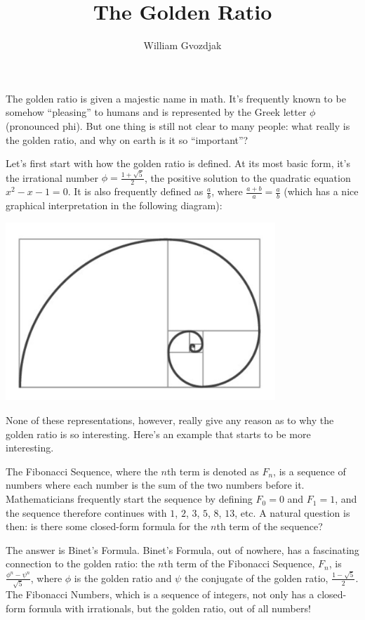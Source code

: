\documentclass{article}
\title{The Golden Ratio}
\author{William Gvozdjak}
\begin{document}
\maketitle

The golden ratio is given a majestic name in math. It’s frequently known to be somehow “pleasing” to humans and is represented by the Greek letter $\phi$ (pronounced phi). But one thing is still not clear to many people: what really is the golden ratio, and why on earth is it so “important”? 

Let’s first start with how the golden ratio is defined. At its most basic form, it’s the irrational number $\phi = \frac{1+\sqrt5}2$, the positive solution to the quadratic equation $x^2-x-1=0$. It is also frequently defined as $\frac ab$, where $\frac{a+b}a = \frac ab$ (which has a nice graphical interpretation in the following diagram):

\begin{center}
    \includegraphics[width=4in]{images/golden-ratio.png}
\end{center}

None of these representations, however, really give any reason as to why the golden ratio is so interesting. Here’s an example that starts to be more interesting.

The Fibonacci Sequence, where the $n$th term is denoted as $F_n$, is a sequence of numbers where each number is the sum of the two numbers before it. Mathematicians frequently start the sequence by defining $F_0=0$ and $F_1=1$, and the sequence therefore continues with $1$, $2$, $3$, $5$, $8$, $13$, etc. A natural question is then: is there some closed-form formula for the $n$th term of the sequence?

The answer is Binet’s Formula. Binet’s Formula, out of nowhere, has a fascinating connection to the golden ratio: the $n$th term of the Fibonacci Sequence, $F_n$, is $\frac{\phi^n - \psi^n}{\sqrt5}$, where $\phi$ is the golden ratio and $\psi$ the conjugate of the golden ratio, $\frac{1-\sqrt{5}}{2}$. The Fibonacci Numbers, which is a sequence of integers, not only has a closed-form formula with irrationals, but the golden ratio, out of all numbers!
\end{document}
